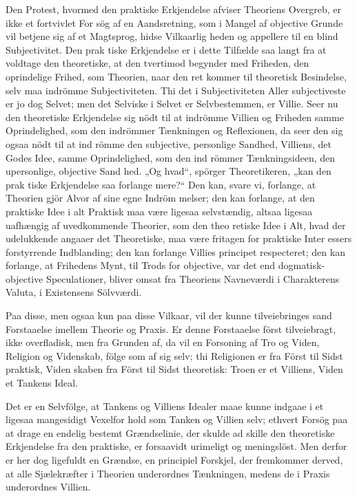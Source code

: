 \documentclass[12pt,a4paper]{article}
\newcommand{\opage}[1]{\marginnote{\footnotesize\textit{[#1]}}}
\begin{document}
Den Protest, hvormed den praktiske Erkjendelse
afviser Theoriens Overgreb, er ikke et fortvivlet For\-%
sög af en Aandsretning, som i Mangel af objective
Grunde vil betjene sig af et Magtsprog, hidse Vilkaarlig\-%
heden og appellere til en blind Subjectivitet. Den prak\-%
tiske Erkjendelse er i dette Tilfælde saa langt fra at
voldtage den theoretiske, at den tvertimod begynder
med Friheden, den oprindelige Frihed, som Theorien,
naar den ret kommer til theoretisk Besindelse, selv maa
indrömme Subjectiviteten. Thi det i Subjectiviteten Aller\-%
subjectiveste er jo dog Selvet; men det Selviske i Selvet
er Selvbestemmen, er Villie. Seer nu den theoretiske
Erkjendelse sig nödt til at indrömme Villien og Friheden
samme Oprindelighed, som den indrömmer Tænkningen
og Reflexionen, da seer den sig ogsaa nödt til at ind\-%
\opage{72}römme den subjective, personlige Sandhed, Villiens,
det Godes Idee, samme Oprindelighed, som den ind\-%
römmer Tænkningsideen, den upersonlige, objective Sand\-%
hed. „Og hvad“, spörger Theoretikeren, „kan den prak\-%
tiske Erkjendelse saa forlange mere?“ Den kan, svare vi,
forlange, at Theorien gjör Alvor af sine egne Indröm\-%
melser; den kan forlange, at den praktiske Idee i alt
Praktisk maa være ligesaa selvstændig, altsaa ligesaa
uafhængig af uvedkommende Theorier, som den theo\-%
retiske Idee i Alt, hvad der udelukkende angaaer
det Theoretiske, maa være fritagen for praktiske Inter\-%
essers forstyrrende Indblanding; den kan forlange Villies\-%
principet respecteret; den kan forlange, at Frihedens Mynt,
til Trods for objective, var det end dogmatisk-objective
Speculationer, bliver omsat fra Theoriens Navneværdi i
Charakterens Valuta, i Existensens Sölvværdi.

Paa disse, men ogsaa kun paa disse Vilkaar, vil
der kunne tilveiebringes sand Forstaaelse imellem Theorie
og Praxis. Er denne Forstaaelse först tilveiebragt, ikke
overfladisk, men fra Grunden af, da vil en Forsoning af
Tro og Viden, Religion og Videnskab, fölge som af sig
selv; thi Religionen er fra Först til Sidst praktisk, Viden\-%
skaben fra Först til Sidst theoretisk: Troen er et Villiens,
Viden et Tankens Ideal.

Det er en Selvfölge, at Tankens og Villiens Idealer
maae kunne indgaae i et ligesaa mangesidigt Vexelfor\-%
hold som Tanken og Villien selv; ethvert Forsög paa at
drage en endelig bestemt Grændselinie, der skulde ad\-%
skille den theoretiske Erkjendelse fra den praktiske, er
forsaavidt urimeligt og meningslöst. Men derfor er her
dog ligefuldt en Grændse, en principiel Forskjel, der
fremkommer derved, at alle Sjælekræfter i Theorien
underordnes Tænkningen, medens de i Praxis underordnes
Villien.
\end{document}
